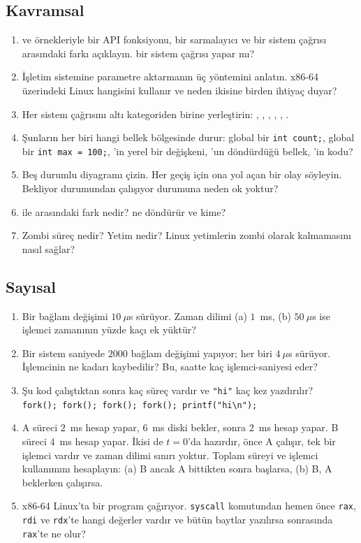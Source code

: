 \subsection*{Kavramsal}
\begin{enumerate}[leftmargin=1.6em]
  \item {} ve  örnekleriyle bir API fonksiyonu, bir sarmalayıcı ve bir sistem çağrısı arasındaki farkı açıklayın.  bir sistem çağrısı yapar mı?
  \item İşletim sistemine parametre aktarmanın üç yöntemini anlatın. x86-64 üzerindeki Linux hangisini kullanır ve neden ikisine birden ihtiyaç duyar?
  \item Her sistem çağrısını altı kategoriden birine yerleştirin: , , , , , .
  \item Şunların her biri hangi bellek bölgesinde durur: global bir \texttt{int count;}, global bir \texttt{int max = 100;}, 'in yerel bir değişkeni, 'un döndürdüğü bellek, 'in kodu?
  \item Beş durumlu diyagramı çizin. Her geçiş için ona yol açan bir olay söyleyin. Bekliyor durumundan çalışıyor durumuna neden ok yoktur?
  \item {} ile  arasındaki fark nedir?  ne döndürür ve kime?
  \item Zombi süreç nedir? Yetim nedir? Linux yetimlerin zombi olarak kalmamasını nasıl sağlar?
\end{enumerate}

\subsection*{Sayısal}
\begin{enumerate}[leftmargin=1.6em,resume]
  \item Bir bağlam değişimi $10\ \mu$s sürüyor. Zaman dilimi (a) $1$~ms, (b) $50\ \mu$s ise işlemci zamanının yüzde kaçı ek yüktür?
  \item Bir sistem saniyede $2000$ bağlam değişimi yapıyor; her biri $4\ \mu$s sürüyor. İşlemcinin ne kadarı kaybedilir? Bu, saatte kaç işlemci-saniyesi eder?
  \item Şu kod çalıştıktan sonra kaç süreç vardır ve \texttt{"hi"} kaç kez yazdırılır?\\ \texttt{fork(); fork(); fork(); fork(); printf("hi\textbackslash n");}
  \item A süreci $2$~ms hesap yapar, $6$~ms diski bekler, sonra $2$~ms hesap yapar. B süreci $4$~ms hesap yapar. İkisi de $t = 0$'da hazırdır, önce A çalışır, tek bir işlemci vardır ve zaman dilimi sınırı yoktur. Toplam süreyi ve işlemci kullanımını hesaplayın: (a) B ancak A bittikten sonra başlarsa, (b) B, A beklerken çalışırsa.
  \item x86-64 Linux'ta bir program  çağırıyor. \texttt{syscall} komutundan hemen önce \texttt{rax}, \texttt{rdi} ve \texttt{rdx}'te hangi değerler vardır ve bütün baytlar yazılırsa sonrasında \texttt{rax}'te ne olur?
\end{enumerate}

